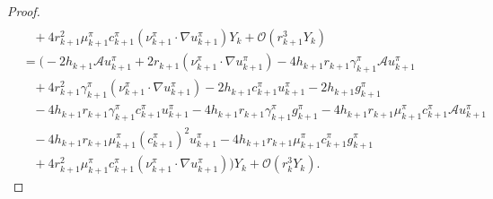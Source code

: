\documentclass[10pt,a4paper]{amsart}
\begin{document}
\begin{proof}
\begin{align}
\nonumber \\ & \;\;\;
+ 4r_{k+1}^{2}\mu_{k+1}^{\pi}c_{k+1}^{\pi}(\nu_{k+1}^{\pi}\cdot \nabla u_{k+1}^{\pi})Y_{k} +\mathcal{O}(r_{k+1}^{3}Y_{k})
\nonumber  \\ & =
  \Big(-2h_{k+1}\mathcal{A}u_{k+1}^{\pi}  + 2r_{k+1}(\nu_{k+1}^{\pi}\cdot \nabla u_{k+1}^{\pi}) - 4h_{k+1}r_{k+1}\gamma_{k+1}^{\pi}\mathcal{A}u_{k+1}^{\pi} \nonumber  \\&  \;\;\; +  4r_{k+1}^{2}\gamma_{k+1}^{\pi} (\nu_{k+1}^{\pi} \cdot \nabla u_{k+1}^{\pi}) - 2h_{k+1}c_{k+1}^{\pi}u_{k+1}^{\pi} - 2h_{k+1}g_{k+1}^{\pi} \nonumber  \\&  \;\;\;  - 4h_{k+1}r_{k+1}\gamma_{k+1}^{\pi}c^{\pi}_{k+1}u_{k+1}^{\pi} - 4h_{k+1}r_{k+1}\gamma_{k+1}^{\pi}g^{\pi}_{k+1} - 4h_{k+1}r_{k+1}\mu_{k+1}^{\pi}c_{k+1}^{\pi} \mathcal{A}u_{k+1}^{\pi} \nonumber  \\&  \;\;\;  - 4h_{k+1}r_{k+1}\mu_{k+1}^{\pi}(c_{k+1}^{\pi})^{2}u_{k+1}^{\pi} - 4h_{k+1}r_{k+1}\mu_{k+1}^{\pi}c^{\pi}_{k+1}g^{\pi}_{k+1} \nonumber  \\& \;\;\; + 4r_{k+1}^{2}\mu_{k+1}^{\pi}c_{k+1}^{\pi}(\nu^{\pi}_{k+1}\cdot \nabla u_{k+1}^{\pi}) \Big)Y_{k}  
  + \mathcal{O}(r_{k}^{3}Y_{k}).\label{ref_eqn4.14}
\end{align}


\end{proof}
\end{document}
